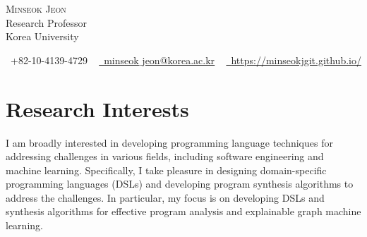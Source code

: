 \documentclass[letterpaper,11pt]{article}
\begin{document}

\begin{center}
    {\Huge \scshape Minseok Jeon} \\ \vspace{1pt}
    Research Professor\\\vspace{1pt}
    Korea University\\\vspace{1pt}
        
    \small \raisebox{-0.1\height}\faPhone\ +82-10-4139-4729 ~ \href{mailto:minseok_jeon@korea.ac.kr}{\raisebox{-0.2\height}\faEnvelope\  \underline{minseok$\_$jeon@korea.ac.kr}} ~ 
    \href{https://minseokjgit.github.io/}{\raisebox{-0.2\height}\faHome\ \underline{https://minseokjgit.github.io/}} 
    \vspace{-8pt}
\end{center}

\section{Research Interests}
I am broadly interested in developing programming language techniques for addressing challenges in various fields, including software engineering and machine learning.
%
Specifically, I take pleasure in designing domain-specific programming languages (DSLs) and developing program synthesis algorithms to address the challenges.
%
In particular, my focus is on developing DSLs and synthesis algorithms for effective program analysis and explainable graph machine learning.


\end{document}
